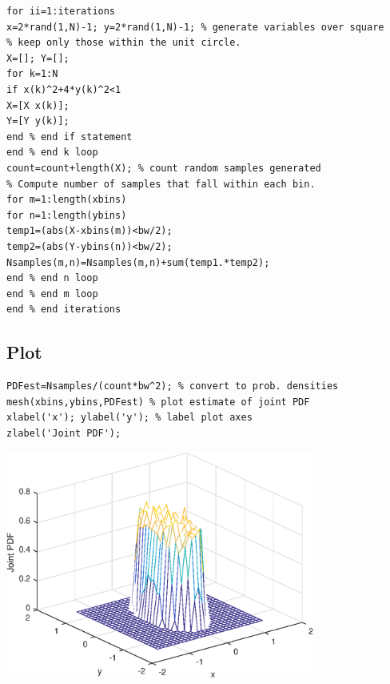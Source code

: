 \documentclass[12pt]{article}
\begin{document}
\begin{verbatim}
for ii=1:iterations
x=2*rand(1,N)-1; y=2*rand(1,N)-1; % generate variables over square
% keep only those within the unit circle.
X=[]; Y=[];
for k=1:N
if x(k)^2+4*y(k)^2<1
X=[X x(k)];
Y=[Y y(k)];
end % end if statement
end % end k loop
count=count+length(X); % count random samples generated
% Compute number of samples that fall within each bin.
for m=1:length(xbins)
for n=1:length(ybins)
temp1=(abs(X-xbins(m))<bw/2);
temp2=(abs(Y-ybins(n))<bw/2);
Nsamples(m,n)=Nsamples(m,n)+sum(temp1.*temp2);
end % end n loop
end % end m loop
end % end iterations
\end{verbatim}


\subsection*{Plot}

\begin{verbatim}
PDFest=Nsamples/(count*bw^2); % convert to prob. densities
mesh(xbins,ybins,PDFest) % plot estimate of joint PDF
xlabel('x'); ylabel('y'); % label plot axes
zlabel('Joint PDF');
\end{verbatim}

\includegraphics [width=4in]{prob_5_79_01.eps}
\end{document}
